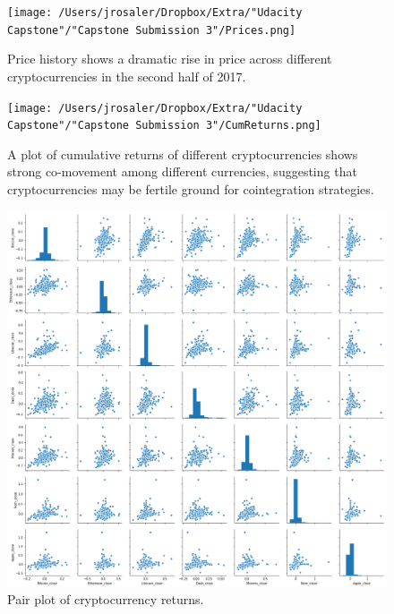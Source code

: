 \documentclass{article}
\begin{document}
\begin{figure}[]
\texttt{[image: /Users/jrosaler/Dropbox/Extra/"Udacity Capstone"/"Capstone Submission 3"/Prices.png]}
\caption{Price history shows a dramatic rise in price across different cryptocurrencies in the second half of 2017. }
\label{FigPrices}
\end{figure}

\begin{figure}[]
\texttt{[image: /Users/jrosaler/Dropbox/Extra/"Udacity Capstone"/"Capstone Submission 3"/CumReturns.png]}
\caption{A plot of cumulative returns of different cryptocurrencies shows strong co-movement among different currencies, suggesting that cryptocurrencies may be fertile ground for cointegration strategies.}
\label{FigCumRet}
\end{figure}

\begin{figure}[]
\includegraphics[scale=0.30]{PairplotReturns.png}
\caption{Pair plot of cryptocurrency returns.}
\label{FigPairPlot}
\end{figure}
\end{document}
